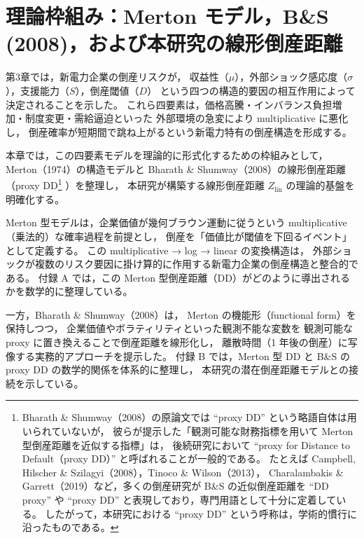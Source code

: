 
\chapter{理論枠組み：Merton モデル，B\&S (2008)，および本研究の線形倒産距離}
\label{chap:theory}

第3章では，新電力企業の倒産リスクが，
収益性（$\mu$），外部ショック感応度（$\sigma$），支援能力（$S$），倒産閾値（$D$）
という四つの構造的要因の相互作用によって決定されることを示した。
これら四要素は，価格高騰・インバランス負担増加・制度変更・需給逼迫といった
外部環境の急変により multiplicative に悪化し，
倒産確率が短期間で跳ね上がるという新電力特有の倒産構造を形成する。

本章では，この四要素モデルを理論的に形式化するための枠組みとして，
Merton（1974）の構造モデルと Bharath \& Shumway（2008）の線形倒産距離（proxy DD\footnote{
Bharath \& Shumway（2008）の原論文では “proxy DD” という略語自体は用いられていないが，
彼らが提示した「観測可能な財務指標を用いて Merton 型倒産距離を近似する指標」は，
後続研究において “proxy for Distance to Default（proxy DD）” と呼ばれることが一般的である。
たとえば Campbell, Hilscher \& Szilagyi（2008），Tinoco \& Wilson（2013），
Charalambakis \& Garrett（2019）など，多くの倒産研究が B\&S の近似倒産距離を
“DD proxy” や “proxy DD” と表現しており，専門用語として十分に定着している。
したがって，本研究における “proxy DD” という呼称は，学術的慣行に沿ったものである。
}
）を整理し，
本研究が構築する線形倒産距離 $Z_{\text{lin}}$ の理論的基盤を明確化する。

Merton 型モデルは，企業価値が幾何ブラウン運動に従うという
multiplicative（乗法的）な確率過程を前提とし，
倒産を「価値比が閾値を下回るイベント」として定義する。
この multiplicative → log → linear の変換構造は，
外部ショックが複数のリスク要因に掛け算的に作用する新電力企業の倒産構造と整合的である。
付録 A では，この Merton 型倒産距離（DD）がどのように導出されるかを数学的に整理している。

一方，Bharath \& Shumway（2008）は，
Merton の機能形（functional form）を保持しつつ，
企業価値やボラティリティといった観測不能な変数を
観測可能な proxy に置き換えることで倒産距離を線形化し，
離散時間（1 年後の倒産）に写像する実務的アプローチを提示した。
付録 B では，Merton 型 DD と B\&S の proxy DD の数学的関係を体系的に整理し，
本研究の潜在倒産距離モデルとの接続を示している。

